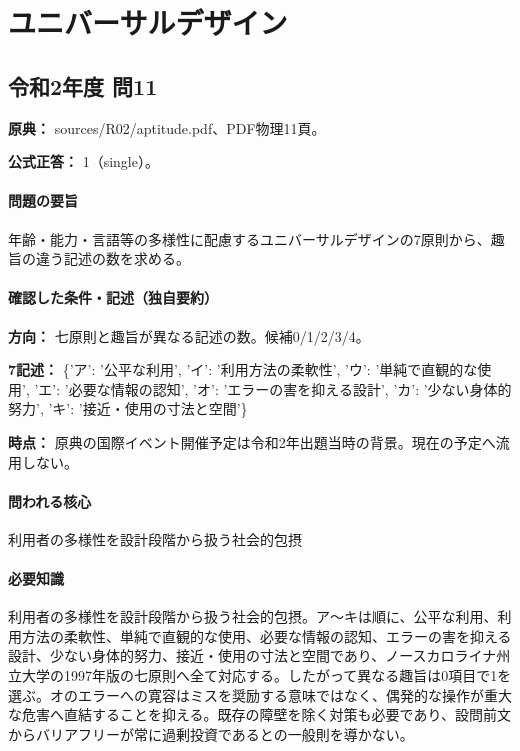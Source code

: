 \section{ユニバーサルデザイン}

\subsection{令和2年度 問11}
\label{q:r02-reg-apt-11}

\noindent\textbf{原典：} sources/R02/aptitude.pdf、PDF物理11頁。

\textbf{公式正答：} 1（single）。

\paragraph{問題の要旨} 年齢・能力・言語等の多様性に配慮するユニバーサルデザインの7原則から、趣旨の違う記述の数を求める。

\paragraph{確認した条件・記述（独自要約）}\mbox{}\par

\noindent\textbf{方向：} 七原則と趣旨が異なる記述の数。候補0/1/2/3/4。\par

\noindent\textbf{7記述：} \{'ア': '公平な利用', 'イ': '利用方法の柔軟性', 'ウ': '単純で直観的な使用', 'エ': '必要な情報の認知', 'オ': 'エラーの害を抑える設計', 'カ': '少ない身体的努力', 'キ': '接近・使用の寸法と空間'\}\par

\noindent\textbf{時点：} 原典の国際イベント開催予定は令和2年出題当時の背景。現在の予定へ流用しない。\par

\paragraph{問われる核心} 利用者の多様性を設計段階から扱う社会的包摂

\paragraph{必要知識} 利用者の多様性を設計段階から扱う社会的包摂。ア〜キは順に、公平な利用、利用方法の柔軟性、単純で直観的な使用、必要な情報の認知、エラーの害を抑える設計、少ない身体的努力、接近・使用の寸法と空間であり、ノースカロライナ州立大学の1997年版の七原則へ全て対応する。したがって異なる趣旨は0項目で1を選ぶ。オのエラーへの寛容はミスを奨励する意味ではなく、偶発的な操作が重大な危害へ直結することを抑える。既存の障壁を除く対策も必要であり、設問前文からバリアフリーが常に過剰投資であるとの一般則を導かない。

